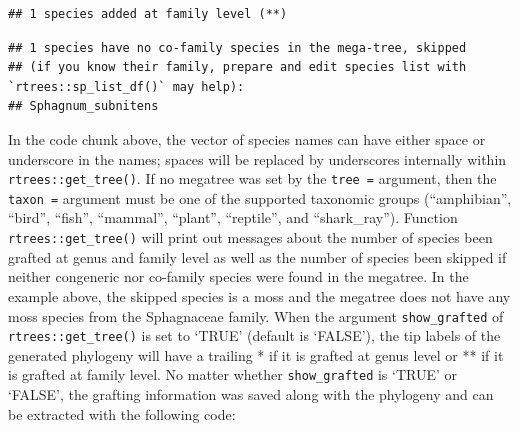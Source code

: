 \documentclass[
  12pt,
]{article}
\newenvironment{Shaded}{\begin{snugshade}}{\end{snugshade}}
\newcommand{\CommentTok}[1]{\textcolor[rgb]{0.56,0.35,0.01}{\textit{#1}}}
\newcommand{\NormalTok}[1]{#1}
\newcommand{\SpecialCharTok}[1]{\textcolor[rgb]{0.00,0.00,0.00}{#1}}
\begin{document}
\begin{verbatim}
## 1 species added at family level (**)
\end{verbatim}

\begin{verbatim}
## 1 species have no co-family species in the mega-tree, skipped
## (if you know their family, prepare and edit species list with `rtrees::sp_list_df()` may help): 
## Sphagnum_subnitens
\end{verbatim}

In the code chunk above, the vector of species names can have either space or underscore in the names; spaces will be replaced by underscores internally within \texttt{rtrees::get\_tree()}. If no megatree was set by the \texttt{tree\ =} argument, then the \texttt{taxon\ =} argument must be one of the supported taxonomic groups (``amphibian'', ``bird'', ``fish'', ``mammal'', ``plant'', ``reptile'', and ``shark\_ray''). Function \texttt{rtrees::get\_tree()} will print out messages about the number of species been grafted at genus and family level as well as the number of species been skipped if neither congeneric nor co-family species were found in the megatree. In the example above, the skipped species is a moss and the megatree does not have any moss species from the Sphagnaceae family. When the argument \texttt{show\_grafted} of \texttt{rtrees::get\_tree()} is set to `TRUE' (default is `FALSE'), the tip labels of the generated phylogeny will have a trailing * if it is grafted at genus level or ** if it is grafted at family level. No matter whether \texttt{show\_grafted} is `TRUE' or `FALSE', the grafting information was saved along with the phylogeny and can be extracted with the following code:

\begin{Shaded}
\end{Shaded}
\end{document}
